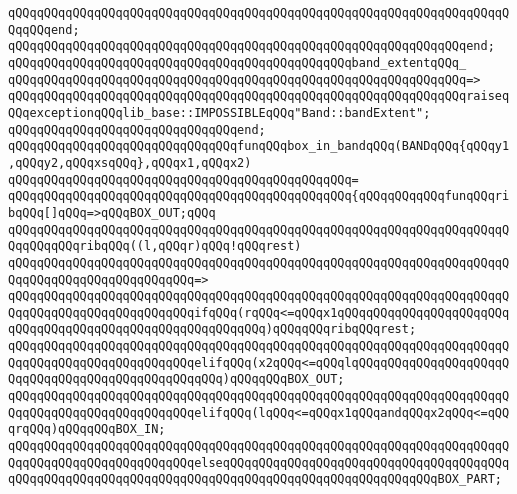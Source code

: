 \verb|qQQqqQQqqQQqqQQqqQQqqQQqqQQqqQQqqQQqqQQqqQQqqQQqqQQqqQQqqQQqqQQqqQQqqQQqqQQqend;|\newline
\newline
\verb|qQQqqQQqqQQqqQQqqQQqqQQqqQQqqQQqqQQqqQQqqQQqqQQqqQQqqQQqqQQqqQQqend;|\newline
\newline
\verb|qQQqqQQqqQQqqQQqqQQqqQQqqQQqqQQqqQQqqQQqqQQqqQQqband_extentqQQq_|\newline
\verb|qQQqqQQqqQQqqQQqqQQqqQQqqQQqqQQqqQQqqQQqqQQqqQQqqQQqqQQqqQQqqQQq=>|\newline
\verb|qQQqqQQqqQQqqQQqqQQqqQQqqQQqqQQqqQQqqQQqqQQqqQQqqQQqqQQqqQQqqQQqraiseqQQqexceptionqQQqlib_base::IMPOSSIBLEqQQq"Band::bandExtent";|\newline
\verb|qQQqqQQqqQQqqQQqqQQqqQQqqQQqqQQqend;|\newline
\newline
\verb|qQQqqQQqqQQqqQQqqQQqqQQqqQQqqQQqfunqQQqbox_in_bandqQQq(BANDqQQq{qQQqy1,qQQqy2,qQQqxsqQQq},qQQqx1,qQQqx2)|\newline
\verb|qQQqqQQqqQQqqQQqqQQqqQQqqQQqqQQqqQQqqQQqqQQqqQQq=|\newline
\verb|qQQqqQQqqQQqqQQqqQQqqQQqqQQqqQQqqQQqqQQqqQQqqQQq{qQQqqQQqqQQqfunqQQqribqQQq[]qQQq=>qQQqBOX_OUT;qQQq|\newline
\newline
\verb|qQQqqQQqqQQqqQQqqQQqqQQqqQQqqQQqqQQqqQQqqQQqqQQqqQQqqQQqqQQqqQQqqQQqqQQqqQQqqQQqribqQQq((l,qQQqr)qQQq!qQQqrest)|\newline
\verb|qQQqqQQqqQQqqQQqqQQqqQQqqQQqqQQqqQQqqQQqqQQqqQQqqQQqqQQqqQQqqQQqqQQqqQQqqQQqqQQqqQQqqQQqqQQqqQQq=>|\newline
\verb|qQQqqQQqqQQqqQQqqQQqqQQqqQQqqQQqqQQqqQQqqQQqqQQqqQQqqQQqqQQqqQQqqQQqqQQqqQQqqQQqqQQqqQQqqQQqqQQqifqQQq(rqQQq<=qQQqx1qQQqqQQqqQQqqQQqqQQqqQQqqQQqqQQqqQQqqQQqqQQqqQQqqQQqqQQqqQQq)qQQqqQQqribqQQqrest;|\newline
\verb|qQQqqQQqqQQqqQQqqQQqqQQqqQQqqQQqqQQqqQQqqQQqqQQqqQQqqQQqqQQqqQQqqQQqqQQqqQQqqQQqqQQqqQQqqQQqqQQqelifqQQq(x2qQQq<=qQQqlqQQqqQQqqQQqqQQqqQQqqQQqqQQqqQQqqQQqqQQqqQQqqQQqqQQq)qQQqqQQqBOX_OUT;|\newline
\verb|qQQqqQQqqQQqqQQqqQQqqQQqqQQqqQQqqQQqqQQqqQQqqQQqqQQqqQQqqQQqqQQqqQQqqQQqqQQqqQQqqQQqqQQqqQQqqQQqelifqQQq(lqQQq<=qQQqx1qQQqandqQQqx2qQQq<=qQQqrqQQq)qQQqqQQqBOX_IN;|\newline
\verb|qQQqqQQqqQQqqQQqqQQqqQQqqQQqqQQqqQQqqQQqqQQqqQQqqQQqqQQqqQQqqQQqqQQqqQQqqQQqqQQqqQQqqQQqqQQqqQQqelseqQQqqQQqqQQqqQQqqQQqqQQqqQQqqQQqqQQqqQQqqQQqqQQqqQQqqQQqqQQqqQQqqQQqqQQqqQQqqQQqqQQqqQQqqQQqqQQqqQQqBOX_PART;|\newline
